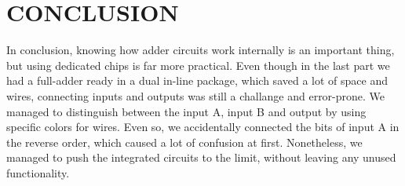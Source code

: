 \documentclass{article}
\begin{document}
\section{CONCLUSION}
In conclusion, knowing how adder circuits work internally is an important thing, but using dedicated chips is far more practical. Even though in the last part we had a full-adder ready in a dual in-line package, which saved a lot of space and wires, connecting inputs and outputs was still a challange and error-prone. We managed to distinguish between the input A, input B and output by using specific colors for wires. Even so, we accidentally connected the bits of input A in the reverse order, which caused a lot of confusion at first. Nonetheless, we managed to push the integrated circuits to the limit, without leaving any unused functionality.
\end{document}
